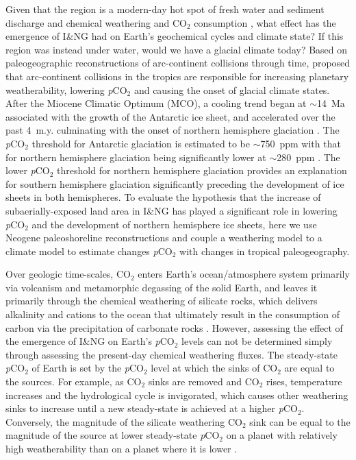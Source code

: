 \documentclass[11pt,letterpaper]{article}
\newcommand{\pCOtwo}{\textit{p}CO$_{2}$\xspace}
\newcommand{\COtwo}{CO$_{2}$\xspace}
\begin{document}
Given that the region is a modern-day hot spot of fresh water and sediment discharge \citep{Milliman2013a} and chemical weathering and \COtwo consumption \citep{Hartmann2009a}, what effect has the emergence of I\&NG had on Earth's geochemical cycles and climate state? If this region was instead under water, would we have a glacial climate today? Based on paleogeographic reconstructions of arc-continent collisions through time, \citet{Macdonald2019a} proposed that arc-continent collisions in the tropics are responsible for increasing planetary weatherability, lowering \pCOtwo and causing the onset of glacial climate states. After the Miocene Climatic Optimum (MCO), a cooling trend began at $\sim$14~Ma associated with the growth of the Antarctic ice sheet, and accelerated over the past 4~m.y. culminating with the onset of northern hemisphere glaciation \citep{Shackleton1984a, Zachos2001a}. The \pCOtwo threshold for Antarctic glaciation is estimated to be $\sim$750~ppm with that for northern hemisphere glaciation being significantly lower at $\sim$280~ppm \citep{DeConto2008a}. The lower \pCOtwo threshold for northern hemisphere glaciation provides an explanation for southern hemisphere glaciation significantly preceding the development of ice sheets in both hemispheres. To evaluate the hypothesis that the increase of subaerially-exposed land area in I\&NG has played a significant role in lowering \pCOtwo and the development of northern hemisphere ice sheets, here we use Neogene paleoshoreline reconstructions and couple a weathering model to a climate model to estimate changes \pCOtwo with changes in tropical paleogeography.

Over geologic time-scales, \COtwo enters Earth's ocean/atmosphere system primarily via volcanism and metamorphic degassing of the solid Earth, and leaves it primarily through the chemical weathering of silicate rocks, which delivers alkalinity and cations to the ocean that ultimately result in the consumption of carbon via the precipitation of carbonate rocks \citep{Kump2000a}. However, assessing the effect of the emergence of I\&NG on Earth's \pCOtwo levels can not be determined simply through assessing the present-day chemical weathering fluxes. The steady-state \pCOtwo of Earth is set by the \pCOtwo level at which the sinks of \COtwo are equal to the sources. For example, as \COtwo sinks are removed and \COtwo rises, temperature increases and the hydrological cycle is invigorated, which causes other weathering sinks to increase until a new steady-state is achieved at a higher \pCOtwo. Conversely, the magnitude of the silicate weathering \COtwo sink can be equal to the magnitude of the source at lower steady-state \pCOtwo on a planet with relatively high weatherability than on a planet where it is lower \citep{Kump1997a}.
\end{document}
